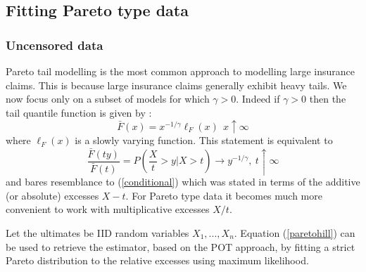 \subsection{Fitting Pareto type data}
\subsubsection*{Uncensored data}
Pareto tail modelling is the most common approach to modelling large insurance claims. This is because large insurance claims generally exhibit heavy tails. We now focus only on a subset of models for which $\gamma > 0$. 
Indeed if $\gamma>0$ then the tail quantile function is given by \citep{sts626}:
\begin{equation}\label{paretoF}
\bar{F}(x)=x^{-1/\gamma}\ell_F(x)\ \ x\uparrow \infty
\end{equation}where $\ell_F(x)$ is a slowly varying function. This statement is equivalent to 
\begin{equation}\label{paretohill}
\dfrac{\bar{F}(ty)}{\bar{F}(t)}=P\left( \dfrac{X}{t} > y| X > t \right)\rightarrow y^{-1/\gamma},\ t\uparrow \infty
\end{equation}and bares resemblance to (\ref{conditional}) which was stated in terms of the additive (or absolute) excesses $X-t$. For Pareto type data it becomes much more convenient to work with multiplicative excesses $X/t$.

Let the ultimates be IID random variables $X_1,...,X_n$. Equation (\ref{paretohill}) can be used to retrieve the \cite{hill1975simple} estimator, based on the POT approach, by fitting a strict Pareto distribution to the relative excesses using maximum likelihood.

